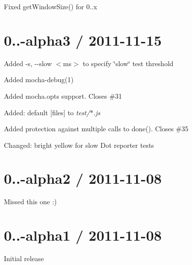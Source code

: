 \begin{DoxyItemize}
\item Fixed get\+Window\+Size() for 0..\+x
\end{DoxyItemize}

\section*{0..-\/alpha3 / 2011-\/11-\/15}


\begin{DoxyItemize}
\item Added {\ttfamily -\/s, -\/-\/slow $<$ms$>$} to specify \char`\"{}slow\char`\"{} test threshold
\item Added {\ttfamily mocha-\/debug(1)}
\item Added {\ttfamily mocha.\+opts} support. Closes \#31
\item Added\+: default \mbox{[}files\mbox{]} to {\itshape test/$\ast$.js}
\item Added protection against multiple calls to {\ttfamily done()}. Closes \#35
\item Changed\+: bright yellow for slow Dot reporter tests
\end{DoxyItemize}

\section*{0..-\/alpha2 / 2011-\/11-\/08}


\begin{DoxyItemize}
\item Missed this one \+:)
\end{DoxyItemize}

\section*{0..-\/alpha1 / 2011-\/11-\/08}


\begin{DoxyItemize}
\item Initial release 
\end{DoxyItemize}